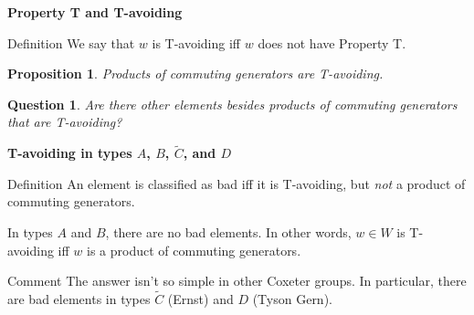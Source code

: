 \documentclass[9pt,handout]{beamer}
\newtheorem{question}{Question}
\newtheorem{proposition}{Proposition}
\newcommand{\<}{\langle}
\renewcommand{\>}{\rangle}
\begin{document}
\begin{frame}{\textbf{Property T and T-avoiding}}
\pause

\begin{block}{Definition}
We say that $w$ is \alert{T-avoiding} iff $w$ does not have Property T.
\end{block}

\pause

\begin{proposition}
Products of commuting generators are T-avoiding.
\end{proposition}

\pause

\begin{question}
Are there other elements besides products of commuting generators that are T-avoiding?
\end{question}

\end{frame}


\begin{frame}{\textbf{T-avoiding in types $A$, $B$, $\widetilde{C}$, and $D$}}\pause

\begin{block}{Definition}
An element is classified as \alert{bad} iff it is T-avoiding, but \emph{not} a product of commuting generators.
\end{block}

\pause

\begin{theorem}
In types $A$ and $B$, there are no bad elements. In other words, $w\in W$ is T-avoiding iff $w$ is a product of commuting generators.
\end{theorem}

\pause

\begin{block}{Comment}
The answer isn't so simple in other Coxeter groups.  In particular, there are bad elements in types $\widetilde{C}$ (Ernst) and $D$ (Tyson Gern).
\end{block}
\end{frame}

\end{document}
